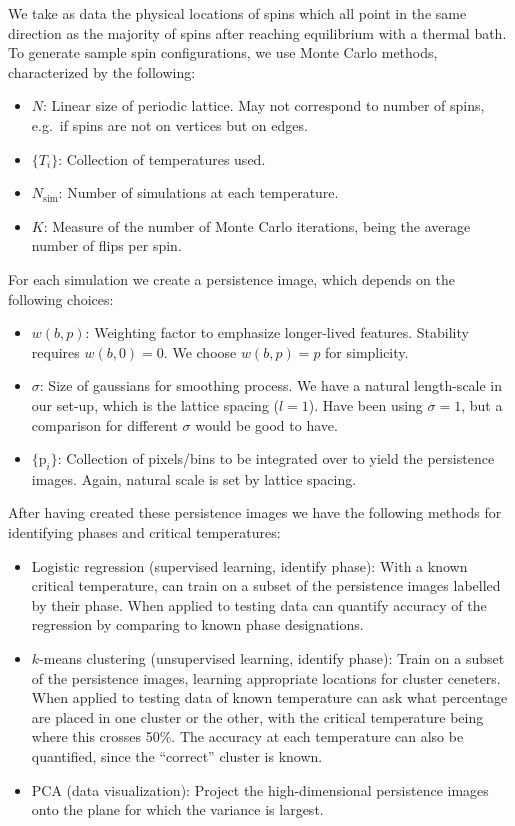 \documentclass[11pt]{article}
\begin{document}
We take as data the physical locations of spins which all point in the same direction as the majority of spins after reaching equilibrium with a thermal bath. To generate sample spin configurations, we use Monte Carlo methods, characterized by the following:
\begin{itemize}
    \item $N$: Linear size of periodic lattice. May not correspond to number of spins, e.g.~if spins are not on vertices but on edges.
    \item $\{T_i\}$: Collection of temperatures used.
    \item $N_\text{sim}$: Number of simulations at each temperature.
    \item $K$: Measure of the number of Monte Carlo iterations, being the average number of flips per spin.
\end{itemize}
For each simulation we create a persistence image, which depends on the following choices:
\begin{itemize}
    \item $w(b,p)$: Weighting factor to emphasize longer-lived features. Stability requires $w(b,0)=0$. We choose $w(b,p)=p$ for simplicity.
    \item $\sigma$: Size of gaussians for smoothing process. We have a natural length-scale in our set-up, which is the lattice spacing ($l=1$). Have been using $\sigma=1$, but a comparison for different $\sigma$ would be good to have.
    \item $\{\text{p}_i\}$: Collection of pixels/bins to be integrated over to yield the persistence images. Again, natural scale is set by lattice spacing.
\end{itemize}
After having created these persistence images we have the following methods for identifying phases and critical temperatures:
\begin{itemize}
    \item Logistic regression (supervised learning, identify phase): With a known critical temperature, can train on a subset of the persistence images labelled by their phase. When applied to testing data can quantify accuracy of the regression by comparing to known phase designations.
    \item $k$-means clustering (unsupervised learning, identify phase): Train on a subset of the persistence images, learning appropriate locations for cluster ceneters. When applied to testing data of known temperature can ask what percentage are placed in one cluster or the other, with the critical temperature being where this crosses 50\%. The accuracy at each temperature can also be quantified, since the ``correct'' cluster is known.
    \item PCA (data visualization): Project the high-dimensional persistence images onto the plane for which the variance is largest.
\end{itemize}
\end{document}

